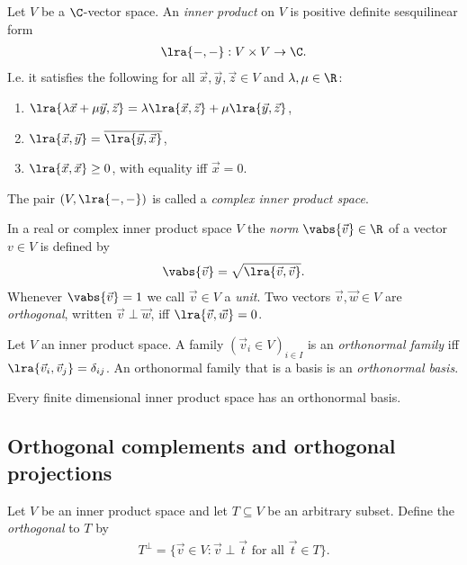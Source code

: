\documentclass{article}
\begin{document}
\begin{definition}
	Let $V$ be a $\C$-vector space. An \emph{inner product} on $V$ is positive definite sesquilinear 
	form
	\begin{align*}
		\lra{-,-}:V\times V\to\C.
	\end{align*}
	I.e. it satisfies the following for all $\vec x,\vec y,\vec z\in V$ and $\lambda,\mu\in\R$:
	\begin{enumerate}
		\item $\lra{\lambda\vec x+\mu\vec y,\vec z}=\lambda\lra{\vec x,\vec z}+\mu\lra{\vec y,\vec z}$,
		\item $\lra{\vec x,\vec y}=\overline{\lra{\vec y,\vec x}}$,
		\item $\lra{\vec x,\vec x}\geq 0$, with equality iff $\vec x =0$.
	\end{enumerate}
	The pair $(V,\lra{-,-})$ is called a \emph{complex inner product space}.
\end{definition}

\begin{definition}
	In a real or complex inner product space $V$ the \emph{norm} $\vabs{\vec v}\in\R$ of a vector $v\in V$
	is defined by 
	\begin{align*}
		\vabs{\vec v}=\sqrt{\lra{\vec v, \vec v}}.
	\end{align*}
	Whenever $\vabs{\vec v}=1$ we call $\vec v\in V$ a \emph{unit}. Two vectors $\vec v,\vec w\in V$
	are \emph{orthogonal}, written $\vec v\perp \vec w$, iff $\lra{\vec v,\vec w}=0$. 
\end{definition}

\begin{definition}
	Let $V$ an inner product space. A family $(\vec v_i\in V)_{i\in I}$ is an \emph{orthonormal family}
	iff $\lra{\vec v_i,\vec v_j}=\delta_{ij}$. An orthonormal family that is a basis is an 
	\emph{orthonormal basis}.
\end{definition}

\begin{theorem}[Notes 5.1.10]
	Every finite dimensional inner product space has an orthonormal basis.	
\end{theorem}

\subsection{Orthogonal complements and orthogonal projections}

\begin{definition}
	Let $V$ be an  inner product space and let $T\subseteq V$ be an arbitrary subset. Define 
	the \emph{orthogonal} to $T$ by
	\begin{align*}
		T^\bot = \{\vec v \in V : \vec v \perp \vec t \text{ for all }\vec t \in T\}.
	\end{align*}
\end{definition}
\end{document}
